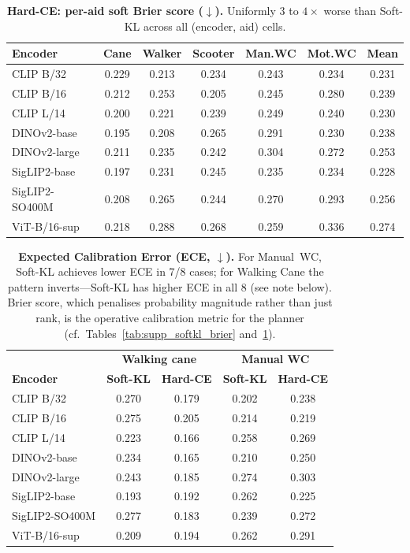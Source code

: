 \documentclass{article}
\begin{document}
\begin{table}[!ht]
\caption{\textbf{Hard-CE: per-aid soft Brier score ($\downarrow$).} Uniformly 3 to $4\times$ worse than Soft-KL across all (encoder, aid) cells.}
\label{tab:supp_hardce_brier}
\centering\scriptsize
\setlength{\tabcolsep}{4pt}
\begin{tabular}{@{}lcccccc@{}}
\toprule
\textbf{Encoder} & \textbf{Cane} & \textbf{Walker} & \textbf{Scooter} & \textbf{Man.WC} & \textbf{Mot.WC} & \textbf{Mean} \\
\midrule
CLIP B/32      & 0.229 & 0.213 & 0.234 & 0.243 & 0.234 & 0.231 \\
CLIP B/16      & 0.212 & 0.253 & 0.205 & 0.245 & 0.280 & 0.239 \\
CLIP L/14      & 0.200 & 0.221 & 0.239 & 0.249 & 0.240 & 0.230 \\
DINOv2-base    & 0.195 & 0.208 & 0.265 & 0.291 & 0.230 & 0.238 \\
DINOv2-large   & 0.211 & 0.235 & 0.242 & 0.304 & 0.272 & 0.253 \\
SigLIP2-base   & 0.197 & 0.231 & 0.245 & 0.235 & 0.234 & 0.228 \\
SigLIP2-SO400M & 0.208 & 0.265 & 0.244 & 0.270 & 0.293 & 0.256 \\
ViT-B/16-sup   & 0.218 & 0.288 & 0.268 & 0.259 & 0.336 & 0.274 \\
\bottomrule
\end{tabular}
\end{table}

\begin{table}[!ht]
\caption{\textbf{Expected Calibration Error (ECE, $\downarrow$).} For Manual~WC, Soft-KL achieves lower ECE in 7/8 cases; for Walking Cane the pattern inverts---Soft-KL has higher ECE in all 8 (see note below). Brier score, which penalises probability magnitude rather than just rank, is the operative calibration metric for the planner (cf.\ Tables~\ref{tab:supp_softkl_brier} and~\ref{tab:supp_hardce_brier}).}
\label{tab:supp_ece}
\centering\scriptsize
\setlength{\tabcolsep}{4pt}
\begin{tabular}{@{}lcc|cc@{}}
\toprule
& \multicolumn{2}{c|}{\textbf{Walking cane}} & \multicolumn{2}{c}{\textbf{Manual WC}} \\
\textbf{Encoder} & \textbf{Soft-KL} & \textbf{Hard-CE} & \textbf{Soft-KL} & \textbf{Hard-CE} \\
\midrule
CLIP B/32      & 0.270 & 0.179 & 0.202 & 0.238 \\
CLIP B/16      & 0.275 & 0.205 & 0.214 & 0.219 \\
CLIP L/14      & 0.223 & 0.166 & 0.258 & 0.269 \\
DINOv2-base    & 0.234 & 0.165 & 0.210 & 0.250 \\
DINOv2-large   & 0.243 & 0.185 & 0.274 & 0.303 \\
SigLIP2-base   & 0.193 & 0.192 & 0.262 & 0.225 \\
SigLIP2-SO400M & 0.277 & 0.183 & 0.239 & 0.272 \\
ViT-B/16-sup   & 0.209 & 0.194 & 0.262 & 0.291 \\
\bottomrule
\end{tabular}
\end{table}
\end{document}
